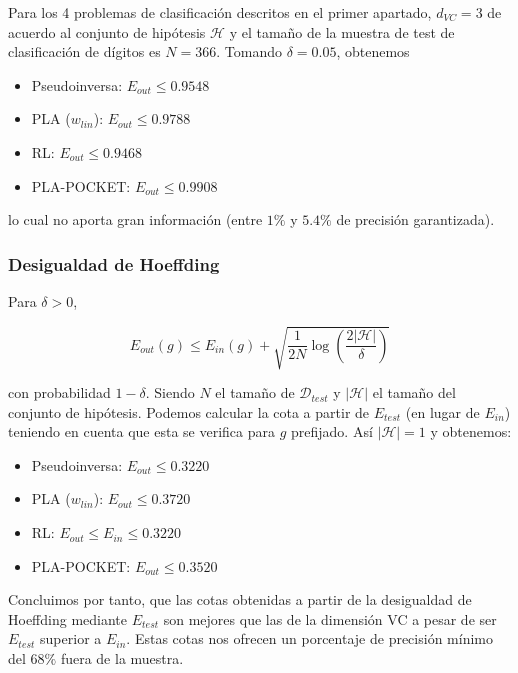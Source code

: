 Para los 4 problemas de clasificación descritos en el primer apartado, $d_{VC} = 3$ 
de acuerdo al conjunto de hipótesis $\mathcal{H}$ y el tamaño de la muestra
de test de clasificación de dígitos es $N = 366$. Tomando $\delta = 0.05$, obtenemos

\begin{itemize}
  \item Pseudoinversa: $E_{out} \leq 0.9548$
  \item PLA ($w_{lin}$): $E_{out} \leq 0.9788$
  \item RL: $E_{out} \leq 0.9468$
  \item PLA-POCKET: $E_{out} \leq 0.9908$
\end{itemize}

lo cual no aporta gran información (entre $1\%$ y $5.4\%$ de precisión garantizada).

\subsubsection{Desigualdad de Hoeffding}

Para $\delta > 0$,

\begin{equation}
E_{out}(g) \leq E_{in}(g) + \sqrt{\frac{1}{2N}\log{\left( \frac{2 |\mathcal{H}|}{\delta} \right) }}
\end{equation}

con probabilidad $1 - \delta$. Siendo $N$ el tamaño de $\mathcal{D}_{test}$ y
$|\mathcal{H}|$ el tamaño del conjunto de hipótesis. Podemos calcular la cota a partir
de $E_{test}$ (en lugar de $E_{in}$) teniendo en cuenta que esta se verifica
para $g$ prefijado. Así $|\mathcal{H}| = 1$ y obtenemos:

\begin{itemize}
  \item Pseudoinversa: $E_{out} \leq 0.3220$
  \item PLA ($w_{lin}$): $E_{out} \leq 0.3720$
  \item RL: $E_{out} \leq E_{in} \leq 0.3220$
  \item PLA-POCKET: $E_{out} \leq 0.3520$
\end{itemize}

Concluimos por tanto, que las cotas obtenidas a partir de la desigualdad de
Hoeffding mediante $E_{test}$ son mejores que las de la dimensión VC a pesar de
ser $E_{test}$ superior a $E_{in}$. Estas cotas nos ofrecen un porcentaje de precisión 
mínimo del $68\%$ fuera de la muestra.